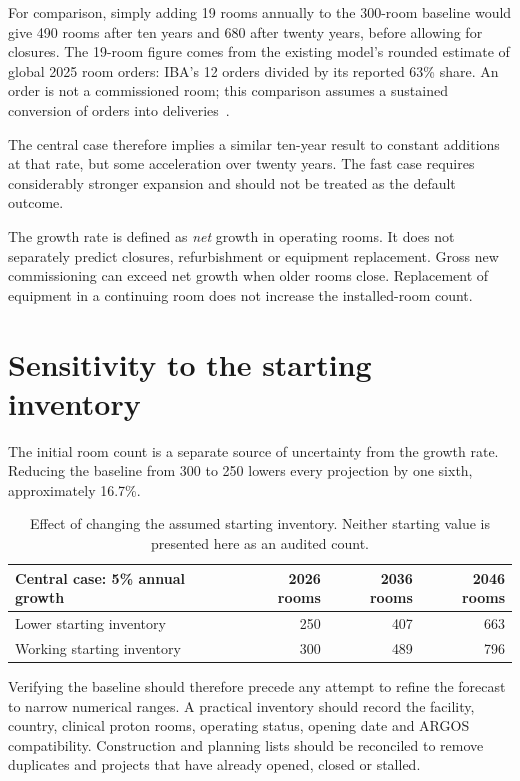 \documentclass[11pt,a4paper]{article}
\begin{document}
For comparison, simply adding 19 rooms annually to the 300-room baseline would
give 490 rooms after ten years and 680 after twenty years, before allowing for
closures. The 19-room figure comes from the existing model's rounded estimate
of global 2025 room orders: IBA's 12 orders divided by its reported 63\% share.
An order is not a commissioned room; this comparison assumes a sustained
conversion of orders into deliveries~\cite{ibapresentation}.

The central case therefore implies a similar ten-year result to constant
additions at that rate, but some acceleration over twenty years. The fast case
requires considerably stronger expansion and should not be treated as the
default outcome.

The growth rate is defined as \emph{net} growth in operating rooms. It does not
separately predict closures, refurbishment or equipment replacement. Gross
new commissioning can exceed net growth when older rooms close. Replacement
of equipment in a continuing room does not increase the installed-room count.

\section{Sensitivity to the starting inventory}

The initial room count is a separate source of uncertainty from the growth
rate. Reducing the baseline from 300 to 250 lowers every projection by one sixth,
approximately 16.7\%.

\begin{table}[htbp]
\centering
\begin{tabular}{lrrr}
\toprule
Central case: 5\% annual growth & 2026 rooms & 2036 rooms & 2046 rooms\\
\midrule
Lower starting inventory & 250 & 407 & 663\\
Working starting inventory & 300 & 489 & 796\\
\bottomrule
\end{tabular}
\caption{Effect of changing the assumed starting inventory. Neither starting
value is presented here as an audited count.}
\end{table}

Verifying the baseline should therefore precede any attempt to refine the
forecast to narrow numerical ranges. A practical inventory should record the
facility, country, clinical proton rooms, operating status, opening date and
ARGOS compatibility. Construction and planning lists should be reconciled to
remove duplicates and projects that have already opened, closed or stalled.
\end{document}
